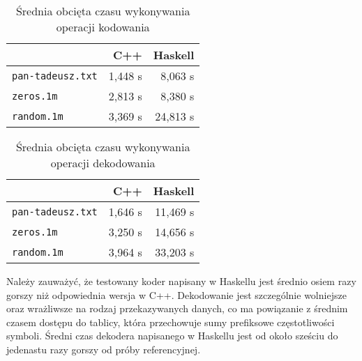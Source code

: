 \documentclass[../../praca.tex]{subfiles}
\begin{document}
\begin{table}[h]
  \centering
  \begin{tabular}{| l | r | r |}
    \hline
    & C++ & Haskell \\ \hline
    \texttt{pan-tadeusz.txt} & 1,448 s & 8,063 s\\ \hline
    \texttt{zeros.1m} & 2,813 s & 8,380 s\\ \hline
    \texttt{random.1m} & 3,369 s & 24,813 s\\ \hline
  \end{tabular}
  \caption{Średnia obcięta czasu wykonywania operacji kodowania}
  \label{tab:encode-time}
\end{table}

\begin{table}[h]
  \centering
  \begin{tabular}{| l | r | r |}
    \hline
    & C++ & Haskell \\ \hline
    \texttt{pan-tadeusz.txt} & 1,646 s & 11,469 s \\ \hline
    \texttt{zeros.1m} & 3,250 s & 14,656 s\\ \hline
    \texttt{random.1m} & 3,964 s & 33,203 s\\ \hline
  \end{tabular}
  \caption{Średnia obcięta czasu wykonywania operacji dekodowania}
  \label{tab:decode-time}
\end{table}

Należy zauważyć, że testowany koder napisany w Haskellu
jest średnio osiem razy gorszy niż odpowiednia wersja w C++.
Dekodowanie jest szczególnie wolniejsze oraz wrażliwsze 
na rodzaj przekazywanych danych, co ma powiązanie z 
średnim czasem dostępu do tablicy, która przechowuje
sumy prefiksowe częstotliwości symboli. Średni czas
dekodera napisanego w Haskellu jest od około sześciu 
do jedenastu razy gorszy od próby referencyjnej.
\end{document}

